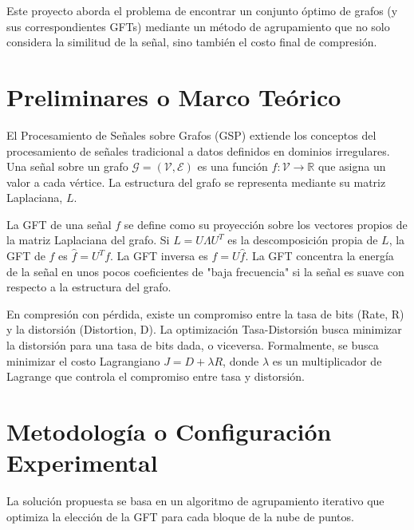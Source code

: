 Este proyecto aborda el problema de encontrar un conjunto óptimo de grafos (y sus correspondientes GFTs) mediante un
método de agrupamiento que no solo considera la similitud de la señal, sino también el costo final de compresión.

\section{Preliminares o Marco Teórico}
\begin{definition}
El Procesamiento de Señales sobre Grafos (GSP) extiende los conceptos del procesamiento de señales tradicional a datos
definidos en dominios irregulares. Una señal sobre un grafo $\mathcal{G} = (\mathcal{V}, \mathcal{E})$ es una función
$f: \mathcal{V} \to \mathbb{R}$ que asigna un valor a cada vértice. La estructura del grafo se representa mediante su
matriz Laplaciana, $L$.
\end{definition}

\begin{definition}
La GFT de una señal $f$ se define como su proyección sobre los vectores propios de la matriz Laplaciana del grafo. Si
$L = U \Lambda U^T$ es la descomposición propia de $L$, la GFT de $f$ es $\hat{f} = U^T f$. La GFT inversa es $f = U
\hat{f}$. La GFT concentra la energía de la señal en unos pocos coeficientes de "baja frecuencia" si la señal es suave
con respecto a la estructura del grafo.
\end{definition}

\begin{definition}
En compresión con pérdida, existe un compromiso entre la tasa de bits (Rate, R) y la distorsión (Distortion, D). La
optimización Tasa-Distorsión busca minimizar la distorsión para una tasa de bits dada, o viceversa. Formalmente, se
busca minimizar el costo Lagrangiano $J = D + \lambda R$, donde $\lambda$ es un multiplicador de Lagrange que controla
el compromiso entre tasa y distorsión.
\end{definition}

\section{Metodología o Configuración Experimental}
La solución propuesta se basa en un algoritmo de agrupamiento iterativo que optimiza la elección de la GFT para cada
bloque de la nube de puntos.

